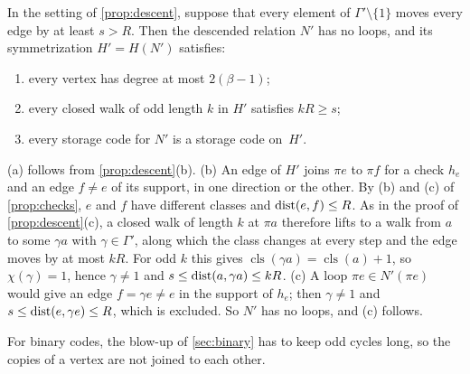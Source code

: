 \begin{proposition}\label{prop:sym}
In the setting of \cref{prop:descent}, suppose that every element of $\Gamma'\setminus\{1\}$ moves every edge by at least
$s>R$. Then the descended relation $N'$ has no loops, and its symmetrization $H'=H(N')$ satisfies:
\begin{enumerate}[label=(\alph*)]
\item every vertex has degree at most $2(\beta-1)$;
\item every closed walk of odd length $k$ in $H'$ satisfies $kR\ge s$;
\item every storage code for $N'$ is a storage code on~$H'$.
\end{enumerate}
\end{proposition}
\begin{outline}
(a) follows from \cref{prop:descent}(b). (b) An edge of $H'$ joins $\pi e$ to $\pi f$ for a check $h_e$ and an edge
$f\ne e$ of its support, in one direction or the other. By (b) and (c) of \cref{prop:checks}, $e$ and $f$ have
different classes and $\operatorname{dist}(e,f)\le R$. As in the proof of \cref{prop:descent}(c), a closed walk of length $k$ at $\pi a$
therefore lifts to a walk from $a$ to some $\gamma a$ with $\gamma\in\Gamma'$, along which the class changes at every
step and the edge moves by at most $kR$. For odd $k$ this gives $\operatorname{cls}(\gamma a)=\operatorname{cls}(a)+1$, so
$\chi(\gamma)=1$, hence $\gamma\ne1$ and $s\le\operatorname{dist}(a,\gamma a)\le kR$. (c) A loop $\pi e\in N'(\pi e)$ would give an
edge $f=\gamma e\ne e$ in the support of $h_e$; then $\gamma\ne1$ and $s\le\operatorname{dist}(e,\gamma e)\le R$, which is excluded. So
$N'$ has no loops, and (c) follows.
\end{outline}

For binary codes, the blow-up of \cref{sec:binary} has to keep odd cycles long, so the copies of a vertex are not joined
to each other.

